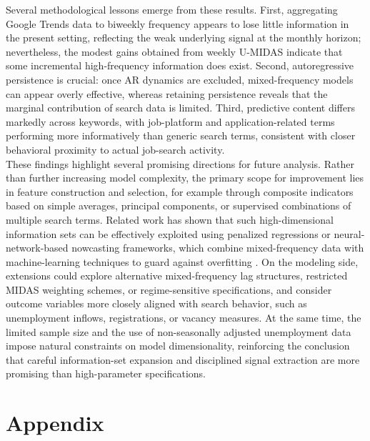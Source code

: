 \documentclass[12pt,a4paper]{article}
\begin{document}
Several methodological lessons emerge from these results. First, aggregating Google Trends data to biweekly frequency appears to lose little information in the present setting, reflecting the weak underlying signal at the monthly horizon; nevertheless, the modest gains obtained from weekly U-MIDAS indicate that some incremental high-frequency information does exist. Second, autoregressive persistence is crucial: once AR dynamics are excluded, mixed-frequency models can appear overly effective, whereas retaining persistence reveals that the marginal contribution of search data is limited. Third, predictive content differs markedly across keywords, with job-platform and application-related terms performing more informatively than generic search terms, consistent with closer behavioral proximity to actual job-search activity. \\
These findings highlight several promising directions for future analysis. Rather than further increasing model complexity, the primary scope for improvement lies in feature construction and selection, for example through composite indicators based on simple averages, principal components, or supervised combinations of multiple search terms. Related work has shown that such high-dimensional information sets can be effectively exploited using penalized regressions or neural-network-based nowcasting frameworks, which combine mixed-frequency data with machine-learning techniques to guard against overfitting \citep{borup2023mixed}. On the modeling side, extensions could explore alternative mixed-frequency lag structures, restricted MIDAS weighting schemes, or regime-sensitive specifications, and consider outcome variables more closely aligned with search behavior, such as unemployment inflows, registrations, or vacancy measures. At the same time, the limited sample size and the use of non-seasonally adjusted unemployment data impose natural constraints on model dimensionality, reinforcing the conclusion that careful information-set expansion and disciplined signal extraction are more promising than high-parameter specifications.




















\newpage
\section{Appendix}
\end{document}
